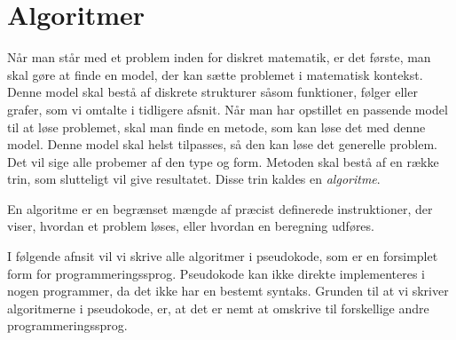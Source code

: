 \chapter{Algoritmer} \label{kap.algo}
Når man står med et problem inden for diskret matematik, er det første, man skal gøre at finde en model, der kan sætte problemet i matematisk kontekst. Denne model skal bestå af diskrete strukturer såsom funktioner, følger eller grafer, som vi omtalte i tidligere afsnit. Når man har opstillet en passende model til at løse problemet, skal man finde en metode, som kan løse det med denne model. Denne model skal helst tilpasses, så den kan løse det generelle problem. Det vil sige alle probemer af den type og form. Metoden skal bestå af en række trin, som slutteligt vil give resultatet. Disse trin kaldes en \emph{algoritme}. 
\begin{defn}
[Algoritmer] En algoritme er en begrænset mængde af præcist definerede instruktioner, der viser, hvordan et problem løses, eller hvordan en beregning udføres. 
\end{defn}
I følgende afnsit vil vi skrive alle algoritmer i pseudokode, som er en forsimplet form for programmeringssprog. Pseudokode kan ikke direkte implementeres i nogen programmer, da det ikke har en bestemt syntaks. Grunden til at vi skriver algoritmerne i pseudokode, er, at det er nemt at omskrive til forskellige andre programmeringssprog.






